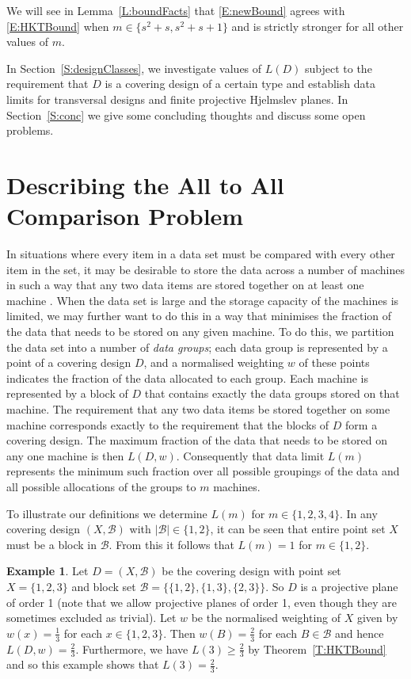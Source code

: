 \documentclass[11pt]{article}
\theoremstyle{definition}
\newtheorem{Example}[Theorem]{Example}
\renewcommand{\geq}{\geqslant}
\newcommand{\B}{{\ensuremath{\mathcal{B}}}}
\begin{document}
We will see in Lemma~\ref{L:boundFacts} that \eqref{E:newBound} agrees with \eqref{E:HKTBound} when $m \in \{s^2+s,s^2+s+1\}$ and is strictly stronger for all other values of $m$.

In Section~\ref{S:designClasses}, we investigate values of $L(D)$ subject to the requirement that $D$ is a covering design of a certain type and establish data limits for transversal designs and finite projective Hjelmslev planes. In Section~\ref{S:conc} we give some concluding thoughts and discuss some open problems.


\section{Describing the All to All Comparison Problem}\label{S:problem}

In situations where every item in a data set must be compared with every other item in the set, it may be desirable to store the data across a number of machines in such a way that any two data items are stored together on at least one machine \cite{HalKelTia,ZhaTiaFidKel,ZhaTiaKelFid}. When the data set is large and the storage capacity of the machines is limited, we may further want to do this in a way that minimises the fraction of the data that needs to be stored on any given machine. To do this, we partition the data set into a number of \emph{data groups}; each data group is represented by a point of a covering design $D$, and a normalised weighting $w$ of these points indicates the fraction of the data allocated to each group. Each machine is represented by a block of $D$ that contains exactly the data groups stored on that machine. The requirement that any two data items be stored together on some machine corresponds exactly to the requirement that the blocks of $D$ form a covering design. The maximum fraction of the data that needs to be stored on any one machine is then $L(D,w)$. Consequently that data limit $L(m)$ represents the minimum such fraction over all possible groupings of the data and all possible allocations of the groups to $m$ machines.

To illustrate our definitions we determine $L(m)$ for $m \in \{1,2,3,4\}$. In any covering design $(X,\B)$ with $|\B| \in \{1,2\}$, it can be seen that entire point set $X$ must be a block in $\B$. From this it follows that $L(m)=1$ for $m \in \{1,2\}$.

\begin{Example}\label{X:order3}
Let $D=(X,\B)$ be the covering design with point set $X=\{1,2,3\}$ and block set $\B=\{\{1,2\},\{1,3\},\{2,3\}\}$. So $D$ is a projective plane of order 1 (note that we allow projective planes of order 1, even though they are sometimes excluded as trivial). Let $w$ be the normalised weighting of $X$ given by $w(x)=\frac{1}{3}$ for each $x \in \{1,2,3\}$. Then $w(B)=\frac{2}{3}$ for each $B \in \B$ and hence $L(D,w)=\frac{2}{3}$. Furthermore, we have $L(3) \geq \frac{2}{3}$ by Theorem~\ref{T:HKTBound} and so this example shows that $L(3)=\frac{2}{3}$.
\end{Example}
\end{document}
